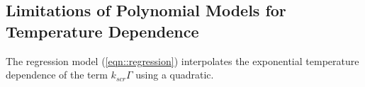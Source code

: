 \subsection{Limitations of Polynomial Models for Temperature Dependence}

The regression model (\ref{eqn::regression}) interpolates the exponential temperature dependence of the term $k_{scr}\Gamma$ using a quadratic.

